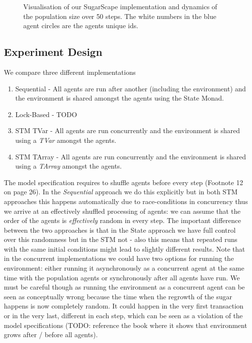 \begin{figure}
\begin{center}
	\caption{Visualisation of our SugarScape implementation and dynamics of the population size over 50 steps. The white numbers in the blue agent circles are the agents unique ids.}
	\label{fig:vis_sugarscape}
\end{center}
\end{figure}

\subsection{Experiment Design}
We compare three different implementations

\begin{enumerate}
	\item Sequential - All agents are run after another (including the environment) and the environment is shared amongst the agents using the State Monad.
	\item Lock-Based - TODO
	\item STM TVar - All agents are run concurrently and the environment is shared using a \textit{TVar} amongst the agents.
	\item STM TArray - All agents are run concurrently and the environment is shared using a \textit{TArray} amongst the agents. 
\end{enumerate}

The model specification requires to shuffle agents before every step (Footnote 12 on page 26). In the \textit{Sequential} approach we do this explicitly but in both STM approaches this happens automatically due to race-conditions in concurrency thus we arrive at an effectively shuffled processing of agents: we can assume that the order of the agents is \textit{effectively} random in every step. The important difference between the two approaches is that in the State approach we have full control over this randomness but in the STM not - also this means that repeated runs with the same initial conditions might lead to slightly different results.
Note that in the concurrent implementations we could have two options for running the environment: either running it asynchronously as a concurrent agent at the same time with the population agents or synchronously after all agents have run. We must be careful though as running the environment as a concurrent agent can be seen as conceptually wrong because the time when the regrowth of the sugar happens is now completely random. It could happen in the very first transaction or in the very last, different in each step, which can be seen as a violation of the model specifications (TODO: reference the book where it shows that environment grows after / before all agents).

